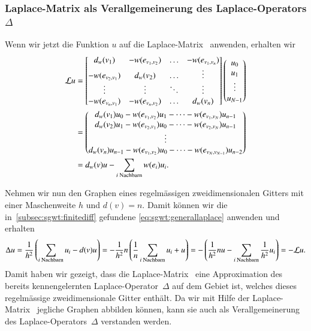 \subsubsection{Laplace-Matrix \texorpdfstring{\laplaceL{}}{L} als 
Verallgemeinerung des Laplace-Operators \texorpdfstring{$\Delta$}{Delta}}

Wenn wir jetzt die Funktion $u$ auf die Laplace-Matrix~\laplaceL{} anwenden,
erhalten wir
\begin{align*}
\laplaceL u &=
\begin{bmatrix}
d_w(v_1) & -w(e_{v_1, v_2}) & \dotso & -w(e_{v_1, v_n}) \\
-w(e_{v_2, v_1}) & d_w(v_2) & \dotso & \vdots \\
\vdots & \vdots & \ddots &  \vdots \\
-w(e_{v_n, v_1}) & -w(e_{v_n, v_2}) & \dotso & d_w(v_n)
\end{bmatrix}
\begin{pmatrix}
u_0 \\
u_1 \\
\vdots \\
u_{N-1}
\end{pmatrix}\\
&=
\begin{pmatrix}
d_w(v_1)u_0 - w(e_{v_1, v_2}) u_1 - \dotsm -w(e_{v_1, v_N}) u_{n-1} \\
d_w(v_2)u_1 - w(e_{v_2, v_1}) u_0 - \dotsm -w(e_{v_2, v_N}) u_{n-1} \\
\vdots \\
d_w(v_n)u_{n-1} - w(e_{v_1, v_2}) u_0 - \dotsm -w(e_{v_N, v_{N-1}}) u_{n-2} \\
\end{pmatrix}\\
&=
d_w(v)u-\sum_{i\text{ Nachbarn}} w(e_i)u_i
.
\end{align*}

Nehmen wir nun den Graphen eines regelm\"assigen zweidimensionalen Gitters 
mit einer Maschenweite $h$ und $d(v) = n$. Damit k\"onnen wir die 
in~\cref{subsec:sgwt:finitediff} gefundene \cref{eq:sgwt:generallaplace} 
anwenden und erhalten
\begin{equation*}
\Delta u
= \frac{1}{h^2}\left(\sum_{i\text{ Nachbarn}}u_i - d(v)u\right)
= -\frac{1}{h^2}n\left(\frac{1}{n}\sum_{i\text{ Nachbarn}}u_i + u\right)
= -\left(\frac{1}{h^2}nu-\sum_{i\text{ Nachbarn}}\frac{1}{h^2}u_i\right)
= -\laplaceL u.
\end{equation*}
Damit haben wir gezeigt, dass die Laplace-Matrix~\laplaceL{} eine Approximation 
des bereits kennengelernten Laplace-Operator~$\Delta$ auf dem Gebiet ist, 
welches dieses regelm\"assige zweidimensionale Gitter enth\"alt. Da wir mit 
Hilfe der Laplace-Matrix~\laplaceL{} jegliche Graphen abbilden k\"onnen, kann 
sie auch als Verallgemeinerung des Laplace-Operators~$\Delta$ verstanden werden.
